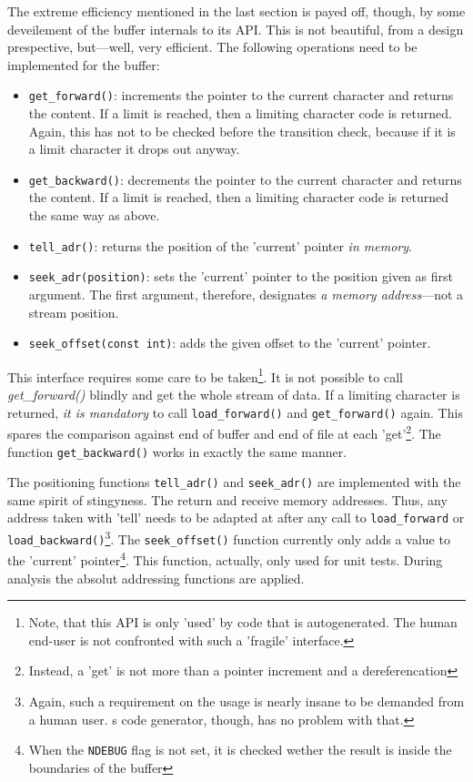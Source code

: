 The extreme efficiency mentioned in the last section is payed off, though, by
some deveilement of the buffer internals to its API.  This is not beautiful,
from a design prespective, but---well, very efficient. The following
operations need to be implemented for the buffer:

\begin{itemize}
\item {\tt get\_forward()}: increments the pointer to the current character and returns the content.
            If a limit is reached, then a limiting character code is returned. Again, this has not
	    to be checked before the transition check, because if it is a limit character it drops
	    out anyway.
\item {\tt get\_backward()}: decrements the pointer to the current character and returns the content.
            If a limit is reached, then a limiting character code is returned the same way as above.
	    
\item {\tt tell\_adr()}:         returns the position of the 'current' pointer {\it in memory}.
\item {\tt seek\_adr(position)}: sets the 'current' pointer to the position given as first argument. The
                                first argument, therefore, designates {\it a memory address}---not 
				a stream position.
\item {\tt seek\_offset(const int)}: adds the given offset to the 'current' pointer.
\end{itemize}

This interface requires some care to be taken\footnote{Note, that this API is only 'used'
by code that is autogenerated. The human end-user is not confronted with
such a 'fragile' interface.}. It is not possible to call {\it get\_forward()} blindly and get
the whole stream of data. If a limiting character is returned, {\it it is mandatory} to call 
{\tt load\_forward()} and {\tt get\_forward()} again. This spares the comparison
against end of buffer and end of file at each 'get'\footnote{Instead, a
'get' is not more than a pointer increment and a dereferencation}. The function {\tt get\_backward()}
works in exactly the same manner.
    
The positioning functions {\tt tell\_adr()} and {\tt seek\_adr()} are implemented with the same
spirit of stingyness. The return and receive memory addresses. Thus, any address taken with 'tell'
needs to be adapted at after any call to {\tt load\_forward} or {\tt load\_backward()}\footnote{Again, such
a requirement on the usage is nearly insane to be demanded from a human user. {\Quex}s code generator, though,
has no problem with that.}. The {\tt seek\_offset()} function currently only adds a value to the
'current' pointer\footnote{When the {\tt NDEBUG} flag is not set, it is checked wether the result is inside
the boundaries of the buffer}. This function, actually, only used for unit tests. During analysis
the absolut addressing functions are applied.
	

